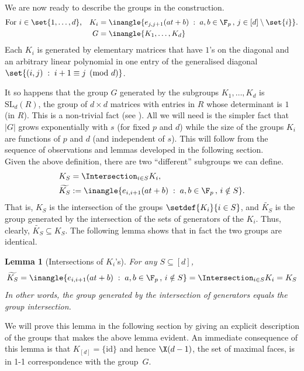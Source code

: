 \documentclass[11pt]{article}
\newtheorem{lemma}[theorem]{Lemma}
\begin{document}
\noindent
We are now ready to describe the groups in the construction.
\begin{align*}
  \text{For $i\in \set{1,\ldots, d}$,}\quad K_i & = \inangle{e_{j,j+1}(at + b)\;:\; a,b \in \F_p\,,\,j \in [d] \setminus \set{i}}.\\
  G & = \inangle{K_1,\ldots, K_d}
\end{align*}
Each $K_i$ is generated by elementary matrices that have $1$'s on the
diagonal and an arbitrary linear polynomial in one entry of the
generalised diagonal %
$\set{(i,j)\;:\; i+1\equiv j \pmod d}$.  %

It so happens that the group $G$ generated by the subgroups
$K_1, \ldots, K_d$ is $\mathrm{SL}_d(R)$, the group of $d\times d$
matrices with entries in $R$ whose determinant is $1$ (in $R$). This
%
is a non-trivial fact %
(see  %
\cite[Theorem 4.3.9]{HM89}).   %
All we will need is the simpler fact that $|G|$
grows exponentially with $s$ (for fixed $p$ and $d$) while the size of
the groups $K_i$ are functions of $p$ and $d$ (and independent of
$s$). This will follow from the sequence of observations and lemmas
developed in the following section.\\

\noindent Given the above definition, there are two ``different''
subgroups we can define. 
\begin{align*}
K_S & = \Intersection_{i\in S} K_i,\\
\widetilde{K_S} &:= \inangle{e_{i,i+1}(at+b)\;:\; a,b\in \F_p\,,\, i\notin S}.
\end{align*}
That is, $K_S$ is the intersection of the groups $\setdef{K_i}{i\in S}$, and
$\widetilde{K_S}$ is the group generated by the intersection of the
sets of %
generators of the
%
$K_i$.  %
Thus, clearly, $\widetilde{K_S} \subseteq K_S$. The following lemma shows that
in fact the two groups are identical. 


\begin{lemma}[Intersections of $K_i$'s]\label{lem:intersection-property-KS}
  For any $S \subseteq [d]$,
  \[
   \widetilde{K_{S}} = \inangle{e_{i,i+1}(at +b)\;:\; a,b\in \F_p\,,\, i\notin S}
    = \Intersection_{i\in S} K_i = K_S
  \]
  In other words, the group generated by the intersection of generators equals the group intersection. 
\end{lemma}

We will prove this lemma in the following section by giving an
explicit description of the groups that makes the above lemma
evident. An immediate consequence of this lemma is that $K_{[d]} =
\{\mathrm{id}\}$ and hence $\X(d-1)$, the set of maximal faces, is in
1-1 correspondence with the group~$G$.   %
\end{document}
